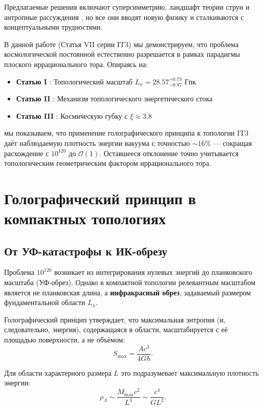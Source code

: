 \documentclass[12pt,a4paper]{article}
\begin{document}
Предлагаемые решения включают суперсимметрию, ландшафт теории струн и антропные рассуждения \citep{Polchinski2006}, но все они вводят новую физику и сталкиваются с концептуальными трудностями.

В данной работе (Статья VII серии IT3) мы демонстрируем, что проблема космологической постоянной естественно разрешается в рамках парадигмы плоского иррационального тора. Опираясь на:
\begin{itemize}
    \item \textbf{Статью I} \citep{Logvinovich2026a}: Топологический масштаб $L_x = 28.57^{+0.73}_{-0.87}$ Гпк
    \item \textbf{Статью II} \citep{Logvinovich2026b}: Механизм топологического энергетического стока
    \item \textbf{Статью III} \citep{Logvinovich2026c}: Космическую губку с $\xi \approx 3.8$
\end{itemize}

мы показываем, что применение голографического принципа к топологии IT3 даёт наблюдаемую плотность энергии вакуума с точностью $\sim 16\%$ — сокращая расхождение с $10^{120}$ до $\mathcal{O}(1)$. Оставшееся отклонение точно учитывается топологическим геометрическим фактором иррационального тора.

\section{Голографический принцип в компактных топологиях}

\subsection{От УФ-катастрофы к ИК-обрезу}

Проблема $10^{120}$ возникает из интегрирования нулевых энергий до планковского масштаба (УФ-обрез). Однако в компактной топологии релевантным масштабом является не планковская длина, а \textbf{инфракрасный обрез}, задаваемый размером фундаментальной области $L_x$.

Голографический принцип \citep{tHooft1993, Susskind1995} утверждает, что максимальная энтропия (и, следовательно, энергия), содержащаяся в области, масштабируется с её площадью поверхности, а не объёмом:
\begin{equation}
S_{\mathrm{max}} = \frac{A c^3}{4 G \hbar}.
\end{equation}

Для области характерного размера $L$ это подразумевает максимальную плотность энергии:
\begin{equation}
\rho_{\Lambda} \sim \frac{M_{\mathrm{max}} c^2}{L^3} \sim \frac{c^4}{G L^2}.
\label{eq:holographic_scaling}
\end{equation}
\end{document}
